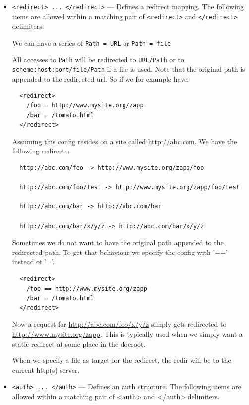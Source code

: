 \documentclass[11pt,oneside,english]{book}
\begin{document}
\begin{itemize}
\item       \verb+<redirect> ... </redirect>+ ---
              Defines a redirect mapping. The following items are allowed within
              a matching pair of \verb+<redirect>+ and \verb+</redirect>+ delimiters.

              We can have a series of \verb+Path = URL+ or \verb+Path = file+

              All accesses to \verb+Path+ will be redirected to \verb+URL/Path+
              or to \verb+scheme:host:port/file/Path+ if a file is
              used. Note that the original path is appended to the redirected
              url. So if we for example have:
\begin{verbatim}
  <redirect>
    /foo = http://www.mysite.org/zapp
    /bar = /tomato.html
  </redirect>
\end{verbatim}
              Assuming this config resides on a site called
              \url{http://abc.com}, We have the following redirects:
\begin{verbatim}
  http://abc.com/foo -> http://www.mysite.org/zapp/foo

  http://abc.com/foo/test -> http://www.mysite.org/zapp/foo/test

  http://abc.com/bar -> http://abc.com/bar

  http://abc.com/bar/x/y/z -> http://abc.com/bar/x/y/z
\end{verbatim}
              Sometimes we do not want to have the original path appended to the
              redirected path. To get that behaviour we specify the config with
              '==' instead of '='.
\begin{verbatim}
  <redirect>
    /foo == http://www.mysite.org/zapp
    /bar = /tomato.html
  </redirect>
\end{verbatim}
              Now a request for \url{http://abc.com/foo/x/y/z} simply gets
              redirected to \url{http://www.mysite.org/zapp}. This is typically
              used when we simply want a static redirect at some place in the
              docroot.

              When we specify a file as target for the redirect, the redir will
              be to the current http(s) server.

\item       \verb+<auth> ... </auth>+ ---
              Defines an auth structure.  The following items are allowed within
              a matching pair of <auth> and </auth> delimiters.


\end{itemize}
\end{document}
